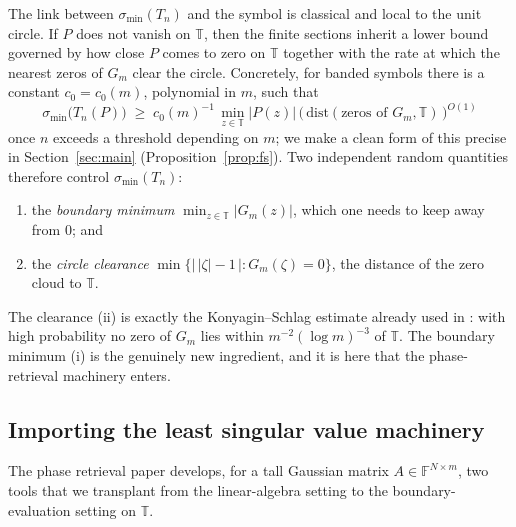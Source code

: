 \documentclass[11pt]{amsart}
\numberwithin{equation}{section}
\theoremstyle{definition}
\theoremstyle{remark}
\newcommand{\F}{\mathbb F}
\newcommand{\T}{\mathbb T}
\newcommand{\smin}{\sigma_{\min}}
\newcommand{\abs}[1]{\left\lvert #1\right\rvert}
\begin{document}
The link between $\smin(T_n)$ and the symbol is classical and local to the unit circle. If $P$ does not vanish on $\T$, then the finite sections inherit a lower bound governed by how close $P$ comes to zero on $\T$ together with the rate at which the nearest zeros of $G_m$ clear the circle. Concretely, for banded symbols there is a constant $c_0=c_0(m)$, polynomial in $m$, such that
\begin{equation}\label{eq:fs-reduction}
  \smin\bigl(T_n(P)\bigr)\;\ge\;c_0(m)^{-1}\,\min_{z\in\T}\abs{P(z)}\,\bigl(\,\mathrm{dist}(\text{zeros of }G_m,\T)\,\bigr)^{O(1)}
\end{equation}
once $n$ exceeds a threshold depending on $m$; we make a clean form of this
precise in Section~\ref{sec:main} (Proposition~\ref{prop:fs}). Two independent
random quantities therefore control $\smin(T_n)$:
\begin{enumerate}[label=(\roman*)]
\item the \emph{boundary minimum} $\min_{z\in\T}\abs{G_m(z)}$, which one needs to keep away from $0$; and
\item the \emph{circle clearance} $\min\{\bigl|\,\abs{\zeta}-1\,\bigr|:G_m(\zeta)=0\}$, the distance of the zero cloud to $\T$.
\end{enumerate}
The clearance (ii) is exactly the Konyagin--Schlag estimate already used in \cite{Parity,KMS}: with high probability no zero of $G_m$ lies within $m^{-2}(\log m)^{-3}$ of $\T$. The boundary minimum (i) is the genuinely new ingredient, and it is here that the phase-retrieval machinery enters.

\subsection{Importing the least singular value machinery}\label{sub:import}

The phase retrieval paper \cite{PhaseRetrieval} develops, for a tall Gaussian matrix $A\in\F^{N\times m}$, two tools that we transplant from the linear-algebra setting to the boundary-evaluation setting on $\T$.
\end{document}
